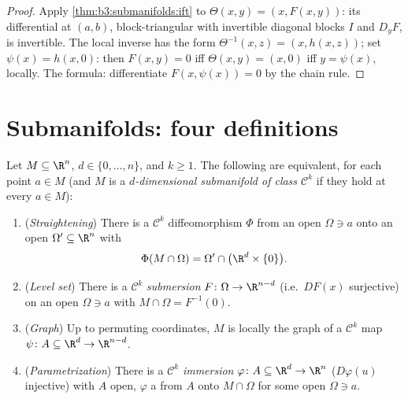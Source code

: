\begin{proof}
Apply \cref{thm:b3:submanifolds:ift} to $\Theta(x, y) = (x,
F(x,y))$: its differential at $(a,b)$, block-triangular with
invertible diagonal blocks $I$ and $D_yF$, is invertible. The
local inverse has the form $\Theta^{-1}(x, z) = (x, h(x,
z))$; set $\psi(x) = h(x, 0)$: then $F(x, y) = 0$ iff
$\Theta(x,y) = (x, 0)$ iff $y = \psi(x)$, locally. The
formula: differentiate $F(x, \psi(x)) = 0$ by the chain
rule.
\end{proof}

\section{Submanifolds: four definitions}

\begin{theorem}
\label{thm:b3:submanifolds:characterizations}
Let $M \subseteq \R^n$, $d \in \{0, \dots, n\}$, and $k \geq
1$. The following are equivalent, for each point $a \in M$
(and $M$ is a \emph{$d$-dimensional submanifold of class
$\mathcal C^k$} if they hold at every $a
\in M$):
\begin{enumerate}
  \item (\emph{Straightening}) There is a $\mathcal C^k$
        diffeomorphism $\Phi$ from an open $\Omega \ni a$
        onto an open $\Omega' \subseteq \R^n$ with
        \[
        \Phi(M\cap\Omega) = \Omega' \cap
        \bigl(\R^d\times\{0\}\bigr).
        \]
  \item (\emph{Level set}) There is a $\mathcal C^k$
        \emph{submersion} $F \colon \Omega \to \R^{n-d}$
        (i.e.\ $DF(x)$ surjective) on an open $\Omega \ni a$
        with $M\cap\Omega = F^{-1}(0)$.
  \item (\emph{Graph}) Up to permuting coordinates, $M$ is
        locally the graph of a $\mathcal C^k$ map $\psi
        \colon A \subseteq \R^d \to \R^{n-d}$.
  \item (\emph{Parametrization}) There is a $\mathcal C^k$
        \emph{immersion} $\varphi \colon A \subseteq \R^d \to
        \R^n$ ($D\varphi(u)$ injective) with $A$ open,
        $\varphi$ a  from $A$ onto $M \cap
        \Omega$ for some open $\Omega \ni a$.
\end{enumerate}
\end{theorem}

